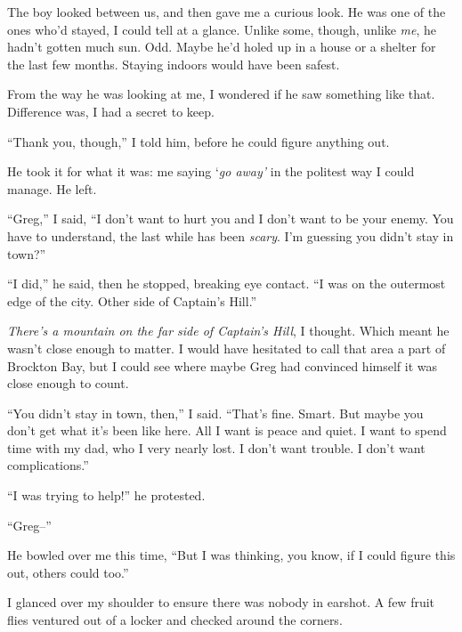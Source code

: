 The boy looked between us, and then gave me a curious look.  He was one of the ones who'd stayed, I could tell at a glance.  Unlike some, though, unlike \emph{me}, he hadn't gotten much sun.  Odd.  Maybe he'd holed up in a house or a shelter for the last few months.  Staying indoors would have been safest.



From the way he was looking at me, I wondered if he saw something like that.  Difference was, I had a secret to keep.



``Thank you, though,'' I told him, before he could figure anything out.



He took it for what it was: me saying `\emph{go away' }in the politest way I could manage.  He left.



``Greg,'' I said, ``I don't want to hurt you and I don't want to be your enemy.  You have to understand, the last while has been \emph{scary}.  I'm guessing you didn't stay in town?''



``I did,'' he said, then he stopped, breaking eye contact.  ``I was on the outermost edge of the city.  Other side of Captain's Hill.''



\emph{There's a mountain on the far side of Captain's Hill}, I thought.  Which meant he wasn't close enough to matter.  I would have hesitated to call that area a part of Brockton Bay, but I could see where maybe Greg had convinced himself it was close enough to count.



``You didn't stay in town, then,'' I said.  ``That's fine.  Smart.  But maybe you don't get what it's been like here.  All I want is peace and quiet.  I want to spend time with my dad, who I very nearly lost.  I don't want trouble.  I don't want complications.''



``I was trying to help!'' he protested.



``Greg--''



He bowled over me this time, ``But I was thinking, you know, if I could figure this out, others could too.''



I glanced over my shoulder to ensure there was nobody in earshot.  A few fruit flies ventured out of a locker and checked around the corners.



